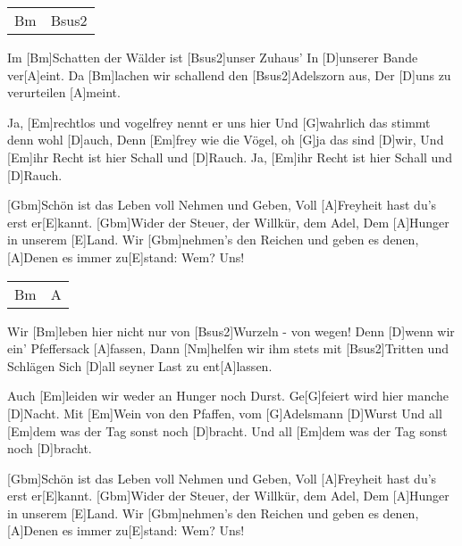 

\begin{guitar}
	 {\footnotesize\begin{tabular}{|l|l|}
			Bm & Bsus2
	\end{tabular} }
	
	Im [Bm]Schatten der Wälder ist [Bsus2]unser Zuhaus'
	In [D]unserer Bande ver[A]eint.
	Da [Bm]lachen wir schallend den [Bsus2]Adelszorn aus,
	Der [D]uns zu verurteilen [A]meint.
	
	Ja, [Em]rechtlos und vogelfrey nennt er uns hier
	Und [G]wahrlich das stimmt denn wohl [D]auch,
	Denn [Em]frey wie die Vögel, oh [G]ja das sind [D]wir,
	Und [Em]ihr Recht ist hier Schall und [D]Rauch.
	Ja, [Em]ihr Recht ist hier Schall und [D]Rauch.
	
	\begin{highlightbar}
		[Gbm]Schön ist das Leben voll Nehmen und Geben,
		Voll [A]Freyheit hast du's erst er[E]kannt.
		[Gbm]Wider der Steuer, der Willkür, dem Adel,
		Dem [A]Hunger in unserem [E]Land.
		Wir [Gbm]nehmen's den Reichen und geben es denen,
		[A]Denen es immer zu[E]stand:
		Wem? Uns!
	\end{highlightbar}
	
	 {\footnotesize\begin{tabular}{|l|l|}
			Bm & A
	\end{tabular} \optionalChord{(x4)}}
	\pagebreak
	\songsection{Strophe 2}
	Wir [Bm]leben hier nicht nur von [Bsus2]Wurzeln - von wegen!
	Denn [D]wenn wir ein' Pfeffersack [A]fassen,
	Dann [Nm]helfen wir ihm stets mit [Bsus2]Tritten und Schlägen
	Sich [D]all seyner Last zu ent[A]lassen.
	
	Auch [Em]leiden wir weder an Hunger noch Durst.
	Ge[G]feiert wird hier manche [D]Nacht.
	Mit [Em]Wein von den Pfaffen, vom [G]Adelsmann [D]Wurst
	Und all [Em]dem was der Tag sonst noch [D]bracht.
	Und all [Em]dem was der Tag sonst noch [D]bracht.
	
	\begin{highlightbar}
		\songsection{Refrain}
		[Gbm]Schön ist das Leben voll Nehmen und Geben,
		Voll [A]Freyheit hast du's erst er[E]kannt.
		[Gbm]Wider der Steuer, der Willkür, dem Adel,
		Dem [A]Hunger in unserem [E]Land.
		Wir [Gbm]nehmen's den Reichen und geben es denen,
		[A]Denen es immer zu[E]stand:
		Wem? Uns!
	\end{highlightbar}
	

\end{guitar}
